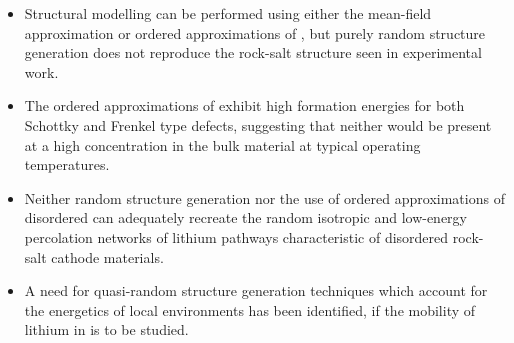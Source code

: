 \begin{itemize}
	\item Structural modelling can be performed using either the mean-field approximation or ordered approximations of , but purely random structure generation does not reproduce the rock-salt structure seen in experimental work.
	\item The ordered approximations of  exhibit high formation energies for both Schottky and Frenkel type defects, suggesting that neither would be present at a high concentration in the bulk material at typical operating temperatures.
	
	\item Neither random structure generation nor the use of ordered approximations of disordered  can adequately recreate the random isotropic and low-energy percolation networks of lithium pathways characteristic of disordered rock-salt cathode materials.
	\item A need for quasi-random structure generation techniques which account for the energetics of local environments has been identified, if the mobility of lithium in  is to be studied.
\end{itemize}



\newpage
